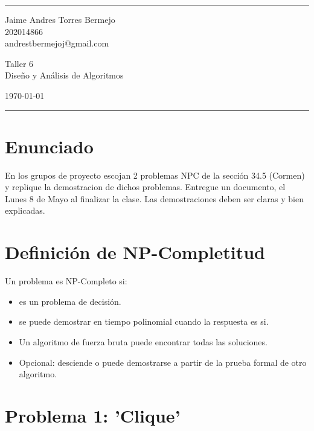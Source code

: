 \documentclass[a4paper]{article}
\begin{document}

\fancyhead[C]{}
\hrule \medskip %
\begin{minipage}{0.295\textwidth} 
\raggedright
\footnotesize
Jaime Andres Torres Bermejo \hfill\\   
202014866\hfill\\
andrestbermejoj@gmail.com
\end{minipage}
\begin{minipage}{0.4\textwidth} 
\centering 
\large 
Taller 6\\ 
\normalsize 
Diseño y Análisis de Algoritmos\\ 
\end{minipage}
\begin{minipage}{0.295\textwidth} 
\raggedleft
\today\hfill\\
\end{minipage}
\medskip\hrule 
\bigskip


\section{Enunciado}
En los grupos de proyecto escojan 2 problemas NPC de la sección 34.5 (Cormen) y
replique la demostracion de dichos problemas. Entregue un documento, el Lunes 8 de
Mayo al finalizar la clase. Las demostraciones deben ser claras y bien explicadas.

\section{Definición de NP-Completitud}
Un problema es NP-Completo si:

\begin{itemize}
    \item es un problema de decisión.
    \item se puede demostrar en tiempo polinomial cuando la respuesta es si.
    \item Un algoritmo de fuerza bruta puede encontrar todas las soluciones.
    \item Opcional: desciende o puede demostrarse a partir de la prueba formal de otro algoritmo.
\end{itemize}
\section{Problema 1: 'Clique'}
\end{document}
